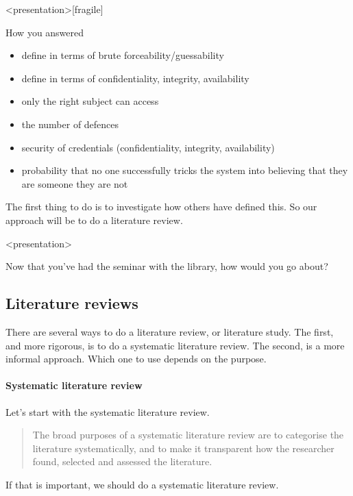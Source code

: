 \begin{frame}<presentation>[fragile]
  \begin{block}{How you answered}
  \begin{itemize}
    \item define in terms of brute forceability/guessability
    \item define in terms of confidentiality, integrity, availability
    \item only the right subject can access
    \item the number of defences
    \item security of credentials (confidentiality, integrity, availability)
    \item probability that no one successfully tricks the system into believing 
      that they are someone they are not
  \end{itemize}
  \end{block}
\end{frame}

\begin{frame}
  \begin{solution}
    The first thing to do is to investigate how others have defined this.
    So our approach will be to do a literature review.
  \end{solution}
\end{frame}

\begin{frame}<presentation>
  \begin{exercise}
    Now that you've had the seminar with the library,
    how would you go about?
  \end{exercise}
\end{frame}

\subsection<article>{Literature reviews}

There are several ways to do a literature review, or literature study.
The first, and more rigorous, is to do a systematic literature review.
The second, is a more informal approach.
Which one to use depends on the purpose.

\paragraph{Systematic literature review}

Let's start with the systematic literature review.
\blockcquote{ANUSLR}{%
The broad purposes of a systematic literature review are to categorise the 
literature systematically, and to make it transparent how the researcher found, 
selected and assessed the literature.%
}
If that is important, we should do a systematic literature review.

